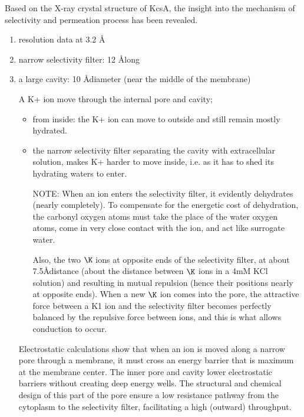Based on the X-ray crystal structure of KcsA, the insight into the mechanism of
selectivity and permeation process has been revealed. 
\begin{enumerate}
  \item resolution data at 3.2 \AA
  
  \item narrow selectivity filter: 12 \AA long
  
  \item a large cavity: 10 \AA diameter (near the middle of the membrane)
  
A K+ ion move through the internal pore and cavity;
\begin{itemize}
  \item from inside: the K+ ion can move to outside and still remain mostly
hydrated.
  \item the narrow selectivity filter separating the cavity with extracellular
  solution, makes K+ harder to move inside, i.e. as it has to shed its hydrating
  waters to enter.
  
\begin{mdframed}

NOTE: When an ion enters the selectivity filter, it evidently dehydrates (nearly
completely). To compensate for the energetic cost of dehydration, the carbonyl
oxygen atoms must take the place of the water oxygen atoms, come in very close
contact with the ion, and act like surrogate water.

Also, the two $\K$ ions at opposite ends of the selectivity filter, at about
7.5\AA distance (about the distance between $\K$ ions in a 4mM KCl solution) and
resulting in mutual repulsion (hence their positions nearly at opposite ends).
When a new $\K$ ion comes into the pore, the attractive force between a K1 ion
and the selectivity filter becomes perfectly balanced by the repulsive force
between ions, and this is what allows conduction to occur.

\end{mdframed}

\end{itemize}

Electrostatic calculations show that when an ion is moved along a narrow pore
through a membrane, it must cross an energy barrier that is maximum at the
membrane center. The inner pore and cavity lower electrostatic barriers without
creating deep energy wells. The structural and chemical design of this part of
the pore ensure a low resistance pathway from the cytoplasm to the selectivity
filter, facilitating a high (outward) throughput.
  

\end{enumerate}
